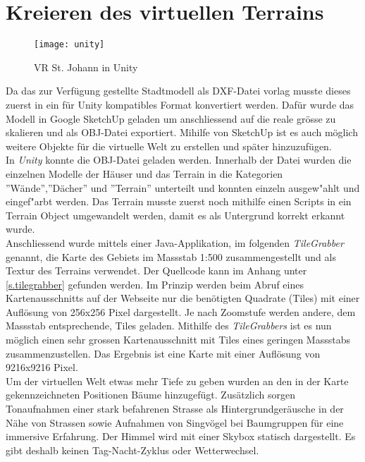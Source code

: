 \vspace{-10pt}
\section{Kreieren des virtuellen Terrains}\label{s.terrain}
\begin{wrapfigure}{r}{0.5\textwidth}
	\vspace{-25pt}
	\begin{center}
		\texttt{[image: unity]}
	\end{center}
	\vspace{-15pt}
	\caption{VR St. Johann in Unity}\label{unity}
	\vspace{-15pt}
\end{wrapfigure}
Da das zur Verfügung gestellte Stadtmodell als DXF-Datei vorlag musste dieses zuerst in ein für Unity kompatibles Format konvertiert werden. Dafür wurde das Modell in Google SketchUp geladen um anschliessend auf die reale grösse zu skalieren und als OBJ-Datei exportiert. Mihilfe von SketchUp ist es auch möglich weitere Objekte für die virtuelle Welt zu erstellen und später hinzuzufügen.\\[6pt]
In \textit{Unity} konnte die OBJ-Datei geladen werden. Innerhalb der Datei wurden die einzelnen Modelle der Häuser und das Terrain in die Kategorien ''Wände'',''Dächer'' und ''Terrain'' unterteilt und konnten einzeln ausgew"ahlt und eingef"arbt werden. Das Terrain musste zuerst noch mithilfe einen Scripts\cite{website:terrain} in ein Terrain Object umgewandelt werden, damit es als Untergrund korrekt erkannt wurde.\\[6pt]
Anschliessend wurde mittels einer Java-Applikation, im folgenden \textit{TileGrabber} genannt, die Karte des Gebiets im Massstab 1:500 zusammengestellt und als Textur des Terrains verwendet. Der Quellcode kann im Anhang unter \ref{s.tilegrabber} gefunden werden. Im Prinzip werden beim Abruf eines Kartenausschnitts auf der Webseite nur die benötigten Quadrate (Tiles) mit einer Auflösung von 256x256 Pixel dargestellt. Je nach Zoomstufe werden andere, dem Massstab entsprechende, Tiles geladen. Mithilfe des \textit{TileGrabbers} ist es nun möglich einen sehr grossen Kartenausschnitt mit Tiles eines geringen Massstabs zusammenzustellen. Das Ergebnis ist eine Karte mit einer Auflösung von 9216x9216 Pixel.\\[6pt]
Um der virtuellen Welt etwas mehr Tiefe zu geben wurden an den in der Karte gekennzeichneten Positionen Bäume hinzugefügt. Zusätzlich sorgen Tonaufnahmen einer stark befahrenen Strasse als Hintergrundgeräusche in der Nähe von Strassen sowie Aufnahmen von Singvögel bei Baumgruppen für eine immersive Erfahrung. Der Himmel wird mit einer Skybox statisch dargestellt. Es gibt deshalb keinen Tag-Nacht-Zyklus oder Wetterwechsel.\\[6pt]
